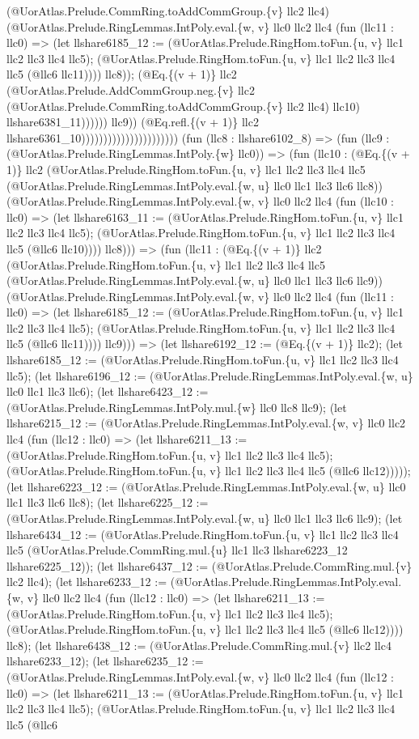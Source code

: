 \documentclass[11pt]{article}
\begin{document}
(@UorAtlas.Prelude.CommRing.toAddCommGroup.\{v\} llc2 llc4) (@UorAtlas.Prelude.RingLemmas.IntPoly.eval.\{w, v\} llc0 llc2 llc4 (fun (llc11 : llc0) => (let llshare6185\_12 := (@UorAtlas.Prelude.RingHom.toFun.\{u, v\} llc1 llc2 llc3 llc4 llc5); (@UorAtlas.Prelude.RingHom.toFun.\{u, v\} llc1 llc2 llc3 llc4 llc5 (@llc6 llc11)))) llc8)); (@Eq.\{(v + 1)\} llc2 (@UorAtlas.Prelude.AddCommGroup.neg.\{v\} llc2 (@UorAtlas.Prelude.CommRing.toAddCommGroup.\{v\} llc2 llc4) llc10) llshare6381\_11)))))) llc9)) (@Eq.refl.\{(v + 1)\} llc2 llshare6361\_10)))))))))))))))))))))) (fun (llc8 : llshare6102\_8) => (fun (llc9 : (@UorAtlas.Prelude.RingLemmas.IntPoly.\{w\} llc0)) => (fun (llc10 : (@Eq.\{(v + 1)\} llc2 (@UorAtlas.Prelude.RingHom.toFun.\{u, v\} llc1 llc2 llc3 llc4 llc5 (@UorAtlas.Prelude.RingLemmas.IntPoly.eval.\{w, u\} llc0 llc1 llc3 llc6 llc8)) (@UorAtlas.Prelude.RingLemmas.IntPoly.eval.\{w, v\} llc0 llc2 llc4 (fun (llc10 : llc0) => (let llshare6163\_11 := (@UorAtlas.Prelude.RingHom.toFun.\{u, v\} llc1 llc2 llc3 llc4 llc5); (@UorAtlas.Prelude.RingHom.toFun.\{u, v\} llc1 llc2 llc3 llc4 llc5 (@llc6 llc10)))) llc8))) => (fun (llc11 : (@Eq.\{(v + 1)\} llc2 (@UorAtlas.Prelude.RingHom.toFun.\{u, v\} llc1 llc2 llc3 llc4 llc5 (@UorAtlas.Prelude.RingLemmas.IntPoly.eval.\{w, u\} llc0 llc1 llc3 llc6 llc9)) (@UorAtlas.Prelude.RingLemmas.IntPoly.eval.\{w, v\} llc0 llc2 llc4 (fun (llc11 : llc0) => (let llshare6185\_12 := (@UorAtlas.Prelude.RingHom.toFun.\{u, v\} llc1 llc2 llc3 llc4 llc5); (@UorAtlas.Prelude.RingHom.toFun.\{u, v\} llc1 llc2 llc3 llc4 llc5 (@llc6 llc11)))) llc9))) => (let llshare6192\_12 := (@Eq.\{(v + 1)\} llc2); (let llshare6185\_12 := (@UorAtlas.Prelude.RingHom.toFun.\{u, v\} llc1 llc2 llc3 llc4 llc5); (let llshare6196\_12 := (@UorAtlas.Prelude.RingLemmas.IntPoly.eval.\{w, u\} llc0 llc1 llc3 llc6); (let llshare6423\_12 := (@UorAtlas.Prelude.RingLemmas.IntPoly.mul.\{w\} llc0 llc8 llc9); (let llshare6215\_12 := (@UorAtlas.Prelude.RingLemmas.IntPoly.eval.\{w, v\} llc0 llc2 llc4 (fun (llc12 : llc0) => (let llshare6211\_13 := (@UorAtlas.Prelude.RingHom.toFun.\{u, v\} llc1 llc2 llc3 llc4 llc5); (@UorAtlas.Prelude.RingHom.toFun.\{u, v\} llc1 llc2 llc3 llc4 llc5 (@llc6 llc12))))); (let llshare6223\_12 := (@UorAtlas.Prelude.RingLemmas.IntPoly.eval.\{w, u\} llc0 llc1 llc3 llc6 llc8); (let llshare6225\_12 := (@UorAtlas.Prelude.RingLemmas.IntPoly.eval.\{w, u\} llc0 llc1 llc3 llc6 llc9); (let llshare6434\_12 := (@UorAtlas.Prelude.RingHom.toFun.\{u, v\} llc1 llc2 llc3 llc4 llc5 (@UorAtlas.Prelude.CommRing.mul.\{u\} llc1 llc3 llshare6223\_12 llshare6225\_12)); (let llshare6437\_12 := (@UorAtlas.Prelude.CommRing.mul.\{v\} llc2 llc4); (let llshare6233\_12 := (@UorAtlas.Prelude.RingLemmas.IntPoly.eval.\{w, v\} llc0 llc2 llc4 (fun (llc12 : llc0) => (let llshare6211\_13 := (@UorAtlas.Prelude.RingHom.toFun.\{u, v\} llc1 llc2 llc3 llc4 llc5); (@UorAtlas.Prelude.RingHom.toFun.\{u, v\} llc1 llc2 llc3 llc4 llc5 (@llc6 llc12)))) llc8); (let llshare6438\_12 := (@UorAtlas.Prelude.CommRing.mul.\{v\} llc2 llc4 llshare6233\_12); (let llshare6235\_12 := (@UorAtlas.Prelude.RingLemmas.IntPoly.eval.\{w, v\} llc0 llc2 llc4 (fun (llc12 : llc0) => (let llshare6211\_13 := (@UorAtlas.Prelude.RingHom.toFun.\{u, v\} llc1 llc2 llc3 llc4 llc5); (@UorAtlas.Prelude.RingHom.toFun.\{u, v\} llc1 llc2 llc3 llc4 llc5 (@llc6 
\end{document}
